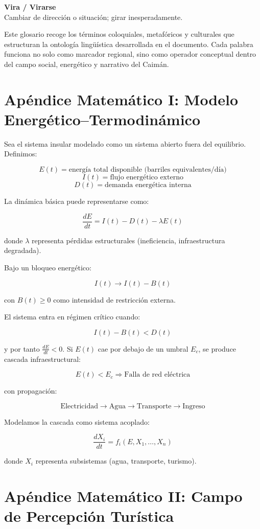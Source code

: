 \documentclass[12pt]{article}
\begin{document}
\textbf{Vira / Virarse}\\
Cambiar de dirección o situación; girar inesperadamente.

\bigskip

Este glosario recoge los términos coloquiales, metafóricos y culturales que estructuran la ontología lingüística desarrollada en el documento. Cada palabra funciona no solo como marcador regional, sino como operador conceptual dentro del campo social, energético y narrativo del Caimán.

\section{Apéndice Matemático I: Modelo Energético--Termodinámico}

Sea el sistema insular modelado como un sistema abierto fuera del equilibrio. Definimos:

\[
E(t) = \text{energía total disponible (barriles equivalentes/día)}
\]
\[
I(t) = \text{flujo energético externo}
\]
\[
D(t) = \text{demanda energética interna}
\]

La dinámica básica puede representarse como:

\[
\frac{dE}{dt} = I(t) - D(t) - \lambda E(t)
\]

donde \( \lambda \) representa pérdidas estructurales (ineficiencia, infraestructura degradada).

Bajo un bloqueo energético:

\[
I(t) \to I(t) - B(t)
\]

con \( B(t) \ge 0 \) como intensidad de restricción externa.

El sistema entra en régimen crítico cuando:

\[
I(t) - B(t) < D(t)
\]

y por tanto \( \frac{dE}{dt} < 0 \). Si \( E(t) \) cae por debajo de un umbral \( E_c \), se produce cascada infraestructural:

\[
E(t) < E_c \Rightarrow \text{Falla de red eléctrica}
\]

con propagación:

\[
\text{Electricidad} \to \text{Agua} \to \text{Transporte} \to \text{Ingreso}
\]

Modelamos la cascada como sistema acoplado:

\[
\frac{dX_i}{dt} = f_i(E, X_1, \dots, X_n)
\]

donde \( X_i \) representa subsistemas (agua, transporte, turismo).

\section{Apéndice Matemático II: Campo de Percepción Turística}
\end{document}
